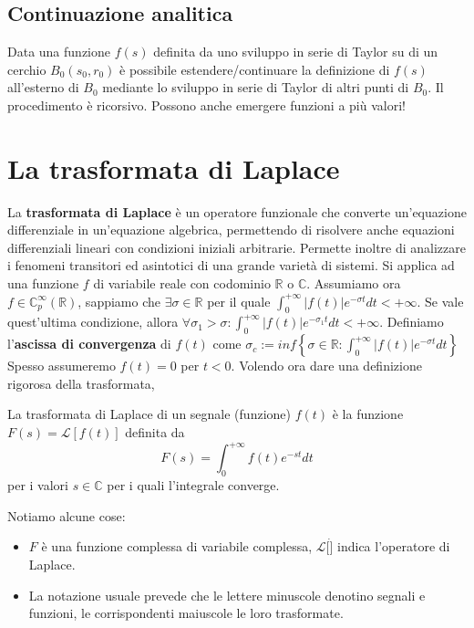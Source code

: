 \documentclass[11pt]{article}
\begin{document}
\subsection{Continuazione analitica}
Data una funzione $f(s)$ definita da uno sviluppo in serie di Taylor su di un cerchio $B_0(s_0, r_0)$ è possibile estendere/continuare la definizione di $f(s)$ all'esterno di $B_0$ mediante lo sviluppo in serie di Taylor di altri punti di $B_0$. Il procedimento è ricorsivo. Possono anche emergere funzioni a più valori!
\section{La trasformata di Laplace}
La \textbf{trasformata di Laplace} è un operatore funzionale che converte un'equazione differenziale in un'equazione algebrica, permettendo di risolvere anche equazioni differenziali lineari con condizioni iniziali arbitrarie.
Permette inoltre di analizzare i fenomeni transitori ed asintotici di una grande varietà di sistemi.
Si applica ad una funzione $f$ di variabile reale con codominio $\mathbb{R}$ o $\mathbb{C}$. Assumiamo ora $f \in \mathbb{C}_p^\infty (\mathbb{R})$, sappiamo che $\exists \sigma \in \mathbb{R}$ per il quale $\int_0^{+\infty} |f(t)| e^{-\sigma t} dt < + \infty$. Se vale quest'ultima condizione, allora $\forall \sigma_1 > \sigma : \int_0^{+\infty} |f(t)| e^{-\sigma_1 t} dt < + \infty$. Definiamo l'\textbf{ascissa di convergenza} di $f(t)$ come $\sigma_c := inf \left\{\sigma \in \mathbb{R} : \int_0^{+\infty}|f(t)| e^{- \sigma t} dt\right\}$ Spesso assumeremo $f(t) = 0$ per $t<0$.
Volendo ora dare una definizione rigorosa della trasformata,
\begin{center}
    La trasformata di Laplace di un segnale (funzione) $f(t)$ è la funzione $F(s) = \mathcal{L}[f(t)]$ definita da
    \begin{displaymath}
        F(s) = \int_0^{+\infty} f(t) e^{-st} dt
    \end{displaymath}
    per i valori $s\in \mathbb{C}$ per i quali l'integrale converge.
\end{center}
Notiamo alcune cose:
\begin{itemize}
    \item $F$ è una funzione complessa di variabile complessa, $\mathcal{L}[\dot]$ indica l'operatore di Laplace.
    \item La notazione usuale prevede che le lettere minuscole denotino segnali e funzioni, le corrispondenti maiuscole le loro trasformate.
\end{itemize}
\end{document}
